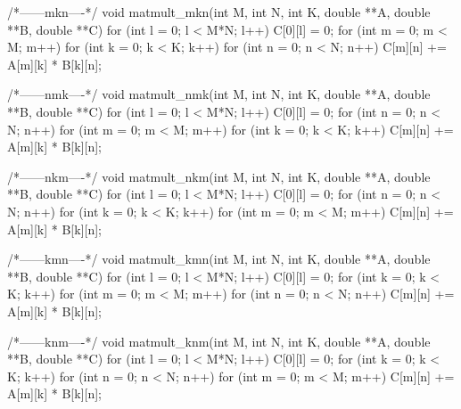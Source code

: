 /*------mkn----*/
void matmult_mkn(int M, int N, int K, double **A, double **B, double **C) {
	for (int l = 0; l < M*N; l++) {
	C[0][l] = 0;
	}
    for (int m = 0; m < M; m++) {
    	for (int k = 0; k < K; k++) {
			for (int n = 0; n < N; n++) {
				C[m][n] += A[m][k] * B[k][n];
			}
    	}	
    }
}

/*------nmk----*/
void matmult_nmk(int M, int N, int K, double **A, double **B, double **C) {
	for (int l = 0; l < M*N; l++) {
	C[0][l] = 0;
	}
    for (int n = 0; n < N; n++) {
    	for (int m = 0; m < M; m++) {
			for (int k = 0; k < K; k++) {
				C[m][n] += A[m][k] * B[k][n];
			}
    	}	
    }
}

/*------nkm----*/
void matmult_nkm(int M, int N, int K, double **A, double **B, double **C) {
	for (int l = 0; l < M*N; l++) {
	C[0][l] = 0;
	}
    for (int n = 0; n < N; n++) {
    	for (int k = 0; k < K; k++) {
			for (int m = 0; m < M; m++) {
				C[m][n] += A[m][k] * B[k][n];
			}
    	}	
    }
}

/*------kmn----*/
void matmult_kmn(int M, int N, int K, double **A, double **B, double **C) {
		for (int l = 0; l < M*N; l++) {
	C[0][l] = 0;
	}
    for (int k = 0; k < K; k++) {
    	for (int m = 0; m < M; m++) {
			for (int n = 0; n < N; n++) {
				C[m][n] += A[m][k] * B[k][n];
			}
    	}	
    }
}

/*------knm----*/
void matmult_knm(int M, int N, int K, double **A, double **B, double **C) {
	for (int l = 0; l < M*N; l++) {
	C[0][l] = 0;
	}
    for (int k = 0; k < K; k++) {
    	for (int n = 0; n < N; n++) {
			for (int m = 0; m < M; m++) {
				C[m][n] += A[m][k] * B[k][n];
			}
    	}	
    }
}
